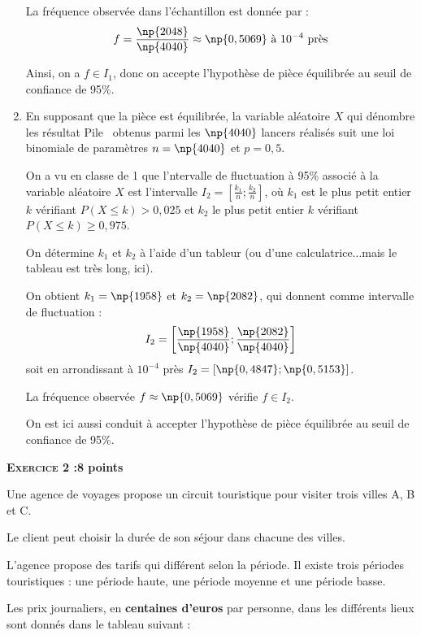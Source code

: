 \begin{spacing}{1.2}
\begin{enumerate}
La fréquence observée dans l'échantillon est donnée par :
\[f=\frac{\np{2048}}{\np{4040}}\approx \np{0,5069}~\text{à}~10^{-4}~\text{près}\]

Ainsi, on a $f\in I_1$, donc on accepte l'hypothèse de pièce équilibrée au seuil de confiance de 95\%.

\item En supposant que la pièce est équilibrée, la variable aléatoire $X$ qui dénombre les résultat \og Pile\fg~ obtenus parmi les $\np{4040}$ lancers réalisés suit une loi binomiale de paramètres $n=\np{4040}$ et $p=0,5$.

On a vu en classe de 1 que l'ntervalle de fluctuation à 95\% associé à la variable aléatoire $X$ est l'intervalle $I_2=\left[\frac{k_1}{n};\frac{k_2}{n}\right]$, où $k_1$ est le plus petit entier $k$ vérifiant $P(X\leq k)> 0,025$ et $k_2$ le plus petit entier $k$ vérifiant $P(X\leq k)\geq 0,975$.

On détermine $k_1$ et $k_2$ à l'aide d'un tableur (ou d'une calculatrice...mais le tableau est très long, ici).

On obtient $k_1=\np{1958}$ et $k_2=\np{2082}$, qui donnent comme intervalle de fluctuation :
\[I_2=\left[\frac{\np{1958}}{\np{4040}};\frac{\np{2082}}{\np{4040}}\right]\]
soit en arrondissant à $10^{-4}$ près $I_2=[\np{0,4847};\np{0,5153}]$.

La fréquence observée $f\approx \np{0,5069}$ vérifie $f\in I_2$.

On est ici aussi conduit à accepter l'hypothèse de pièce équilibrée au seuil de confiance de 95\%.
\end{enumerate}

\newpage
\textbf{\textsc{Exercice 2 :}\hfill 8 points}%
\medskip

Une agence de voyages propose un circuit touristique pour visiter trois villes A, B et C.

Le client peut choisir la durée de son séjour dans chacune des villes.

L'agence propose des tarifs qui différent selon la période. Il existe trois périodes touristiques : une période haute, une période moyenne et une période basse.

Les prix journaliers, en \textbf{centaines d'euros} par personne, dans les différents lieux sont donnés dans le tableau suivant :


\end{spacing}
